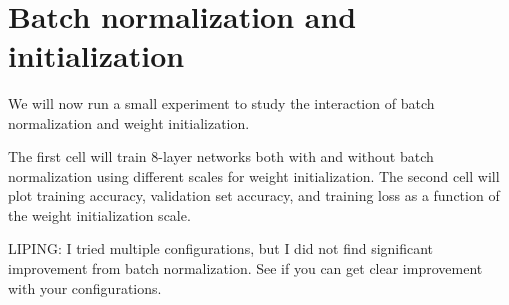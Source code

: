 \documentclass[11pt]{article}
\begin{document}
    \begin{center}
    \end{center}
    { \hspace*{\fill} \\}
    
    \hypertarget{batch-normalization-and-initialization}{%
\section{Batch normalization and
initialization}\label{batch-normalization-and-initialization}}

We will now run a small experiment to study the interaction of batch
normalization and weight initialization.

The first cell will train 8-layer networks both with and without batch
normalization using different scales for weight initialization. The
second cell will plot training accuracy, validation set accuracy, and
training loss as a function of the weight initialization scale.

LIPING: I tried multiple configurations, but I did not find significant
improvement from batch normalization. See if you can get clear
improvement with your configurations.
\end{document}
